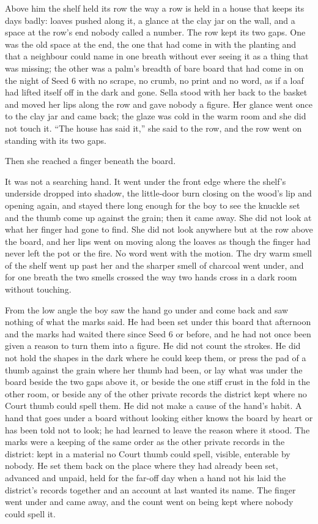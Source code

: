 Above him the shelf held its row the way a row is held in a house that keeps its days badly: loaves pushed along it, a glance at the clay jar on the wall, and a space at the row's end nobody called a number. The row kept its two gaps. One was the old space at the end, the one that had come in with the planting and that a neighbour could name in one breath without ever seeing it as a thing that was missing; the other was a palm's breadth of bare board that had come in on the night of Seed 6 with no scrape, no crumb, no print and no word, as if a loaf had lifted itself off in the dark and gone. Sella stood with her back to the basket and moved her lips along the row and gave nobody a figure. Her glance went once to the clay jar and came back; the glaze was cold in the warm room and she did not touch it. “The house has said it,” she said to the row, and the row went on standing with its two gaps.

Then she reached a finger beneath the board.

It was not a searching hand. It went under the front edge where the shelf's underside dropped into shadow, the little-door burn closing on the wood's lip and opening again, and stayed there long enough for the boy to see the knuckle set and the thumb come up against the grain; then it came away. She did not look at what her finger had gone to find. She did not look anywhere but at the row above the board, and her lips went on moving along the loaves as though the finger had never left the pot or the fire. No word went with the motion. The dry warm smell of the shelf went up past her and the sharper smell of charcoal went under, and for one breath the two smells crossed the way two hands cross in a dark room without touching.

From the low angle the boy saw the hand go under and come back and saw nothing of what the marks said. He had been set under this board that afternoon and the marks had waited there since Seed 6 or before, and he had not once been given a reason to turn them into a figure. He did not count the strokes. He did not hold the shapes in the dark where he could keep them, or press the pad of a thumb against the grain where her thumb had been, or lay what was under the board beside the two gaps above it, or beside the one stiff crust in the fold in the other room, or beside any of the other private records the district kept where no Court thumb could spell them. He did not make a cause of the hand's habit. A hand that goes under a board without looking either knows the board by heart or has been told not to look; he had learned to leave the reason where it stood. The marks were a keeping of the same order as the other private records in the district: kept in a material no Court thumb could spell, visible, enterable by nobody. He set them back on the place where they had already been set, advanced and unpaid, held for the far-off day when a hand not his laid the district's records together and an account at last wanted its name. The finger went under and came away, and the count went on being kept where nobody could spell it.

